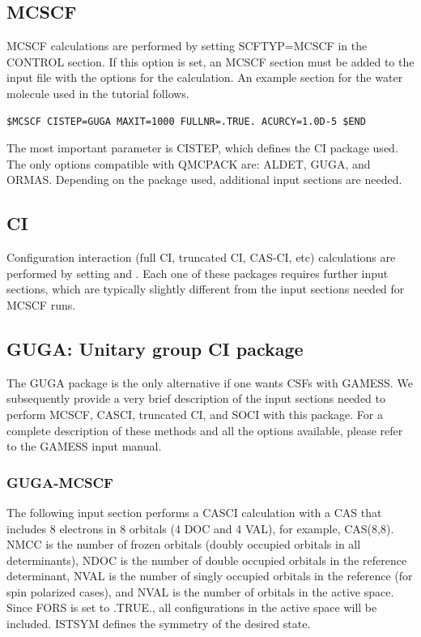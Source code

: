 \subsection{MCSCF}
MCSCF calculations are performed by setting SCFTYP=MCSCF in the CONTROL
section. If this option is set, an MCSCF section must be added to the input file with the
options for the calculation. An example section for the water molecule used in the tutorial
follows.

\begin{lstlisting}[style=GAMESS]
$MCSCF CISTEP=GUGA MAXIT=1000 FULLNR=.TRUE. ACURCY=1.0D-5 $END
\end{lstlisting}

The most important parameter is CISTEP, which defines the CI package used. The only
options compatible with QMCPACK are: ALDET, GUGA, and ORMAS. Depending on the
package used, additional input sections are needed.


\subsection{CI}
Configuration interaction (full CI, truncated CI, CAS-CI, etc) calculations are performed
by setting  and . Each one of these packages 
requires further input sections, which are typically slightly different from the input sections
needed for MCSCF runs.


\subsection{GUGA: Unitary group CI package}
The GUGA package is the only alternative if one wants CSFs with GAMESS. We subsequently provide a very brief description of the input sections needed to perform MCSCF, CASCI,
truncated CI, and SOCI with this package. For a complete description of these methods and
all the options available, please refer to the GAMESS input manual.

\subsubsection{GUGA-MCSCF}
The following input section performs a CASCI calculation with a CAS that includes 8
electrons in 8 orbitals (4 DOC and 4 VAL), for example, CAS(8,8). NMCC is the number of frozen
orbitals (doubly occupied orbitals in all determinants), NDOC is the number of double
occupied orbitals in the reference determinant, NVAL is the number of singly occupied
orbitals in the reference (for spin polarized cases), and NVAL is the number of orbitals in
the active space. Since FORS is set to .TRUE., all configurations in the active space will
be included. ISTSYM defines the symmetry of the desired state.

